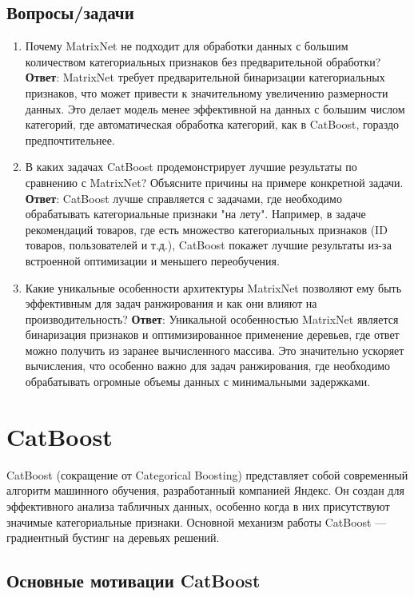 \subsection{Вопросы/задачи}
\begin{enumerate}
    \item Почему MatrixNet не подходит для обработки данных с большим количеством категориальных признаков без предварительной обработки?
    \textbf{Ответ}: MatrixNet требует предварительной бинаризации категориальных признаков, что может привести к значительному увеличению размерности данных. Это делает модель менее эффективной на данных с большим числом категорий, где автоматическая обработка категорий, как в CatBoost, гораздо предпочтительнее.
    
    \item В каких задачах CatBoost продемонстрирует лучшие результаты по сравнению с MatrixNet? Объясните причины на примере конкретной задачи.
    \textbf{Ответ}: CatBoost лучше справляется с задачами, где необходимо обрабатывать категориальные признаки "на лету". Например, в задаче рекомендаций товаров, где есть множество категориальных признаков (ID товаров, пользователей и т.д.), CatBoost покажет лучшие результаты из-за встроенной оптимизации и меньшего переобучения.
    
    \item Какие уникальные особенности архитектуры MatrixNet позволяют ему быть эффективным для задач ранжирования и как они влияют на производительность?
    \textbf{Ответ}: Уникальной особенностью MatrixNet является бинаризация признаков и оптимизированное применение деревьев, где ответ можно получить из заранее вычисленного массива. Это значительно ускоряет вычисления, что особенно важно для задач ранжирования, где необходимо обрабатывать огромные объемы данных с минимальными задержками.
\end{enumerate}


\section{CatBoost}

CatBoost (сокращение от Categorical Boosting) представляет собой современный алгоритм машинного обучения, разработанный компанией Яндекс. Он создан для эффективного анализа табличных данных, особенно когда в них присутствуют значимые категориальные признаки. Основной механизм работы CatBoost — градиентный бустинг на деревьях решений.

\subsection*{Основные мотивации CatBoost}

